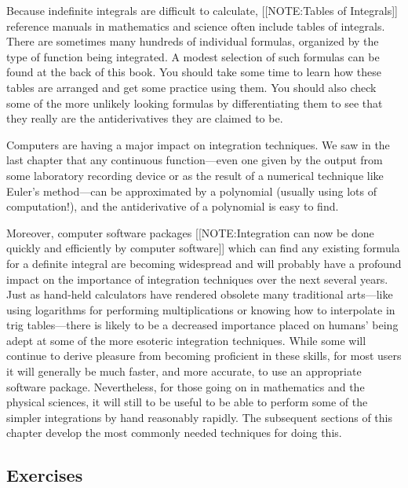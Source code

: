 Because indefinite integrals are difficult to calculate, 
[[NOTE:Tables of Integrals]]
reference manuals in mathematics and science often include tables of
integrals.  There are sometimes many hundreds of individual formulas,
organized by the type of function being integrated.  A modest
selection of such formulas can be found at the back of this book.  You
should take some time to learn how these tables are arranged and get
some practice using them. You should also check some of the more
unlikely looking formulas by differentiating them to see that they
really are the antiderivatives they are claimed to be.

Computers are having a major impact on integration techniques.  We saw
in the last chapter that any continuous function---even one given by
the output from some laboratory recording device or as the result of a
numerical technique like Euler's method---can be approximated by a
polynomial (usually using lots of computation!), and the
antiderivative of a polynomial is easy to find.

Moreover, computer software packages 
[[NOTE:Integration can  now be done  quickly and efficiently  by computer software]]
which can find any existing formula for a definite integral are
becoming widespread and will probably have a profound impact on the
importance of integration techniques over the next several years.
Just as hand-held calculators have rendered obsolete many traditional
arts---like using logarithms for performing multiplications or knowing
how to interpolate in trig tables---there is likely to be a decreased
importance placed on humans' being adept at some of the more esoteric
integration techniques.  While some will continue to derive pleasure
from becoming proficient in these skills, for most users it will
generally be much faster, and more accurate, to use an appropriate
software package.  Nevertheless, for those going on in mathematics and
the physical sciences, it will still to be useful to be able to
perform some of the simpler integrations by hand reasonably rapidly.
The subsequent sections of this chapter develop the most commonly
needed techniques for doing this.


\subsection{Exercises}
\label{subsec:exercises}




